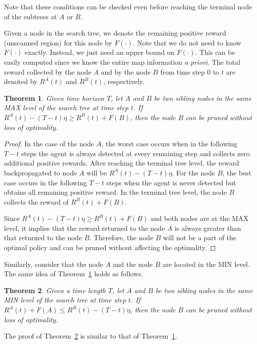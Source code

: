 \documentclass[10 pt, conference]{ieeeconf}
\newtheorem{theorem}{Theorem}
\begin{document}
Note that these conditions can be checked even before reaching the terminal node of the subtrees at $A$ or $B$. 

Given a node in the search tree, we denote the remaining positive reward (unscanned region) for this node by $F(\cdot)$. Note that we do not need to know $F(\cdot)$ exactly. Instead, we just need an upper bound on $F(\cdot)$. This can be easily computed since we know the entire map information \emph{a priori}. The total reward collected by the node $A$ and by the node $B$ from time step $0$ to $t$ are denoted by $R^A(t)$ and $R^B(t)$, respectively.

\begin{theorem}
Given time horizon $T$, let $A$ and $B$ be two sibling nodes in the same MAX level of the search tree at time step $t$. If 
$R^A(t) - (T-t)\eta \ge R^B(t) + F(B)$, then the node $B$ can be pruned without loss of optimality.
 \label{theorem:1}
\end{theorem}
\begin{proof}
In the case of the node $A$, the worst case occurs when in the following $T-t$ steps the agent is always detected at every remaining step and collects zero additional positive rewards. After reaching the terminal tree level, the reward backpropagated to node $A$ will be $R^A(t) - (T-t)\eta$. 
For the node $B$, the best case occurs in the following $T-t$ steps when the agent is never detected but obtains all remaining positive reward. In the terminal tree level, the node $B$ collects the reward of $ R^B(t) + F(B)$.

Since $R^A(t) - (T-t)\eta \ge R^B(t) + F(B)$ and both nodes are at the MAX level, it implies that the reward returned to the node $A$ is always greater than that returned to the node $B$. Therefore, the node $B$ will not be a part of the optimal policy and can be pruned without affecting the optimality.
\end{proof}

Similarly, consider that the node $A$ and the node $B$ are located in the MIN level. The same idea of Theorem~\ref{theorem:1} holds as follows.

\begin{theorem}
Given a time length $T$, let $A$ and $B$ be two sibling nodes in the same MIN level of the search tree at time step $t$. If $R^A(t) + F(A)\le R^B(t)-(T-t)\eta $, then the node $B$ can be pruned without loss of optimality.
 \label{theorem:2}
\end{theorem}
The proof of Theorem~\ref{theorem:2} is similar to that of Theorem~\ref{theorem:1}.
 
\end{document}

